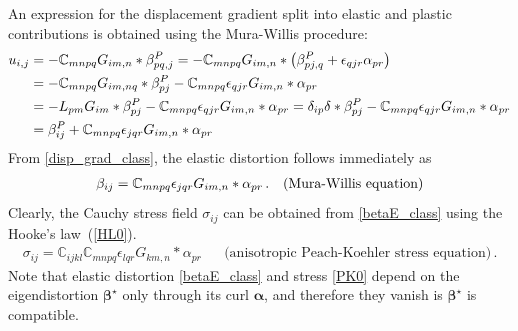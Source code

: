 An expression for the displacement gradient split into elastic and plastic contributions is obtained  using the Mura-Willis procedure: 
\begin{align}
u_{i,j}&=-\mathbb{C}_{mnpq}G_{im,n}*\beta^P_{pq,j}
=-\mathbb{C}_{mnpq}G_{im,n}*\left(\beta^P_{pj,q}+\epsilon_{qjr}\alpha_{pr}\right)\nonumber\\
&=-\mathbb{C}_{mnpq}G_{im,nq}*\beta^P_{pj}-\mathbb{C}_{mnpq}\epsilon_{qjr}G_{im,n}*\alpha_{pr}\nonumber\\
&=-L_{pm}G_{im}*\beta^P_{pj}-\mathbb{C}_{mnpq}\epsilon_{qjr}G_{im,n}*\alpha_{pr}=\delta_{ip}\delta*\beta^P_{pj}-\mathbb{C}_{mnpq}\epsilon_{qjr}G_{im,n}*\alpha_{pr}\nonumber\\
&=\beta^P_{ij}+\mathbb{C}_{mnpq}\epsilon_{jqr}G_{im,n}*\alpha_{pr}
\label{disp_grad_class}
\end{align}
From \eqref{disp_grad_class}, the elastic distortion follows immediately as
\begin{align}
\beta_{ij}=\mathbb{C}_{mnpq}\epsilon_{jqr}G_{im,n}*\alpha_{pr}\,. && \text{(Mura-Willis equation)}
\label{betaE_class}
\end{align}
Clearly, the Cauchy stress field $\sigma_{ij}$ can be obtained from \eqref{betaE_class} using the Hooke's law~(\ref{HL0}). 
\begin{align}
\sigma_{ij}=\mathbb{C}_{ijkl}\mathbb{C}_{mnpq}\epsilon_{lqr}G_{km,n}*\alpha_{pr} &&
\text{(anisotropic Peach-Koehler stress equation)}\,.
\label{PK0}
\end{align}
Note that elastic distortion \eqref{betaE_class} and stress \eqref{PK0} depend on the eigendistortion $\bm \beta^\star$ only through its curl $\bm \alpha$, and therefore they vanish is  $\bm \beta^\star$ is compatible.

